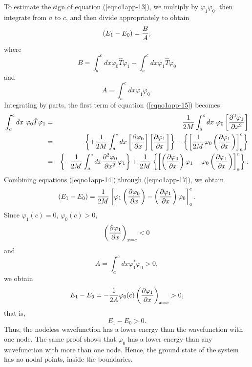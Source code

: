 To estimate the sign of equation (\ref{eqno1app-13}), we multiply by
$\varphi_1 \varphi_0$, then integrate from $a$ to $c$, and then divide
appropriately to obtain
\begin{equation}
\left( E_1 - E_0 \right) = {B \over A} ,
\label{eqno1app-14}
\end{equation}
where
\begin{equation}
B = \int^{c}_{a} d x \varphi_0 {\hat T} \varphi_1 -
\int^{c}_{a} d x  \varphi_1 {\hat T} \varphi_0
\label{eqno1app-15}
\end{equation}
and
\begin{equation}
A = \int^{c}_{a} d x \varphi_1 \varphi_0.
\label{eqno1app-16}
\end{equation}
Integrating by parts, the first term of equation (\ref{eqno1app-15})
becomes 
\begin{eqnarray}
\int^c_a dx\ \varphi_0 {\hat T} \varphi_1 
   &=& {1\over 2M}\int^c_a dx\ \varphi_0 
        \left[ {\partial^2 \varphi_1 \over \partial x^2} \right]\cr
   &=& \left\{ + {1 \over 2M} \int^{c}_{a} d x \left[ {\partial 
\varphi_0 \over \partial x} \right] \left[ {\partial \varphi_1 \over 
\partial x} \right] \right\} - \left\{ \left[ {1 \over 2M} \varphi_0 
\left( {\partial \varphi_1 \over \partial x} \right) \right]^c_a 
\right\}\cr
   &=& \left\{ - {1 \over 2M} \int^{c}_{a} d x {\partial^2 
\varphi_0 \over \partial x^2} \varphi_1 \right\} + {1 
\over 2M} \left\{ \left[ \left( {\partial \varphi_0 \over \partial x} 
\right) \varphi_1 - \varphi_0 \left( {\partial \varphi_1 \over 
\partial x} \right) \right]^c_a \right\}.\cr
\label{eqno1app-17}
\end{eqnarray}
Combining equations (\ref{eqno1app-14}) through (\ref{eqno1app-17}),
we obtain
\begin{equation}
\left( E_1 - E_0 \right) = {1 \over 2M} \left[ \varphi_1 \left( 
{\partial \varphi_0 \over \partial x} \right) - \left( {\partial 
\varphi_1 \over \partial x} \right) \varphi_0 \right]^c_a .
\end{equation}
Since $\varphi_1 (c) = 0$, $\varphi_0 (c) > 0$,
\begin{equation}
\left( {\partial \varphi_1 \over \partial x} \right)_{x=c} < 0
\end{equation}
and
\begin{equation}
A = \int_{a}^{c} d x \varphi_1 ^* \varphi_0 > 0,
\end{equation}
we obtain
\begin{equation}
E_1 - E_0 = - {1 \over 2A} \varphi_0 (c) \left( {\partial \varphi_1 
\over \partial x} \right)_{x=c} > 0 ,
\label{eqno1app-18}
\end{equation}
that is,
\begin{equation}
E_1 - E_0 > 0.
\label{eqno1app-19}
\end{equation}
Thus, the nodeless wavefunction has a lower energy than the wavefunction 
with one node. The same proof shows that $\varphi_0$ has a lower energy 
than any wavefunction with more than one node. Hence, the ground state of 
the system has no nodal points, inside the boundaries.
    
